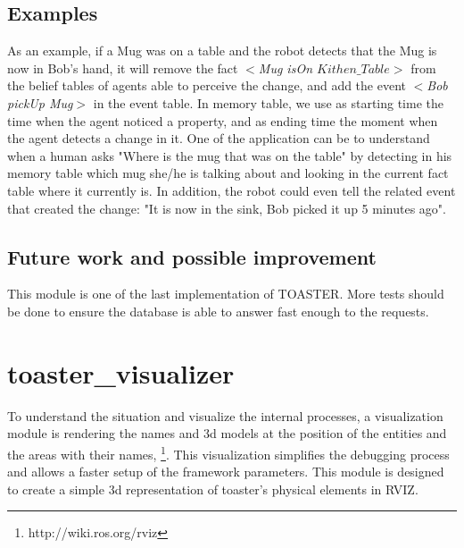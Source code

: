 \documentclass[a4paper]{article}
\begin{document}
\subsection{Examples}
 As an example, if a Mug was on a table and the robot detects that the Mug is now in Bob's hand, it will remove the fact $<$\textit{Mug isOn $Kithen\_Table$}$>$ from the belief tables of agents able to perceive the change, and add the event $<$\textit{Bob pickUp Mug}$>$ in the event table.
In memory table, we use as starting time the time when the agent noticed a property, and as ending time the moment when the agent detects a change in it.
One of the application can be to understand when a human asks "Where is the mug that was on the table" by detecting in his memory table which mug she/he is talking about and looking in the current fact table where it currently is. In addition, the robot could even tell the related event that created the change: "It is now in the sink, Bob picked it up 5 minutes ago".

\subsection{Future work and possible improvement}
This module is one of the last implementation of TOASTER. More tests should be done to ensure the database is able to answer fast enough to the requests.



\section{toaster\_visualizer}
To understand the situation and visualize the internal processes, a visualization module is rendering the names and 3d models at the position of the entities and the areas with their names, 
\footnote{http://wiki.ros.org/rviz}.
This visualization simplifies the debugging process and allows a faster setup of the framework parameters. This module is designed to create a simple 3d representation of toaster's physical elements in RVIZ.
\end{document}

